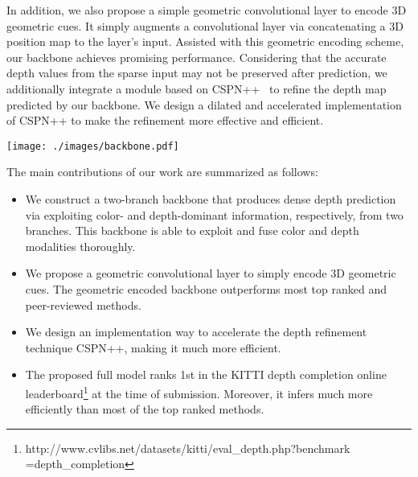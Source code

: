 \documentclass[letterpaper, 10 pt, conference]{ieeeconf}
\begin{document}
In addition, we also propose a simple geometric convolutional layer to encode 3D geometric cues. It simply augments a convolutional layer via concatenating a 3D position map to the layer's input. Assisted with this geometric encoding scheme, our backbone achieves promising performance. Considering that the accurate depth values from the sparse input may not be preserved after prediction, we additionally integrate a module based on CSPN++~\cite{Cheng2020CSPN++} to refine the depth map predicted by our backbone. We design a dilated and accelerated implementation of CSPN++ to make the refinement more effective and efficient. 









\begin{figure*}[t]
\centering
\texttt{[image: ./images/backbone.pdf]} 
\caption{An overview of the proposed framework. It consists of a two-branch backbone and a depth refinement module. The branches predict two dense depth maps, denoted as CD-Depth and DD-Depth respectively, from color-dominant and depth-dominant information. CD-Depth and DD-Depth are adaptively fused and further refined by a dilated and accelerated (DA) CSPN++. Here (1)-(5) denotes multi-scale CD-features which are then concatenated with DD-features.}
\label{fig_framework}
\end{figure*}


The main contributions of our work are summarized as follows:
\begin{itemize}
	\item We construct a two-branch backbone that produces dense depth prediction via exploiting color- and depth-dominant information, respectively, from two branches. This backbone is able to exploit and fuse color and depth modalities thoroughly. 
	\item We propose a geometric convolutional layer to simply encode 3D geometric cues. The geometric encoded backbone outperforms most top ranked and peer-reviewed methods.
	
\item We design an implementation way to accelerate the depth refinement technique CSPN++, making it much more efficient.
	\item The proposed full model ranks 1st in the KITTI depth completion online leaderboard\footnote{http://www.cvlibs.net/datasets/kitti/eval\_depth.php?benchmark\\=depth\_completion} at the time of submission. Moreover, it infers much more efficiently than most of the top ranked methods. 
	\end{itemize}
\end{document}
